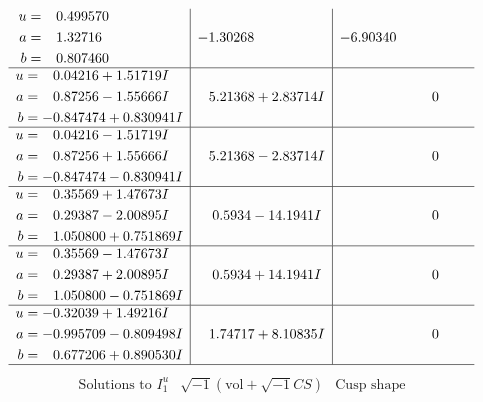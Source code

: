 \documentclass[1p]{elsarticle_modified}
\theoremstyle{definition}
\newcommand{\I}{\sqrt{-1}}
\begin{document}
$$\begin{array}{c|c|c}
\begin{aligned}
u &= \phantom{-}0.499570\phantom{ +0.000000I} \\
a &= \phantom{-}1.32716\phantom{ +0.000000I} \\
b &= \phantom{-}0.807460\phantom{ +0.000000I}\end{aligned}
 & -1.30268\phantom{ +0.000000I} & -6.90340\phantom{ +0.000000I} \\ \hline\begin{aligned}
u &= \phantom{-}0.04216 + 1.51719 I \\
a &= \phantom{-}0.87256 - 1.55666 I \\
b &= -0.847474 + 0.830941 I\end{aligned}
 & \phantom{-}5.21368 + 2.83714 I & \phantom{-0.000000 } 0 \\ \hline\begin{aligned}
u &= \phantom{-}0.04216 - 1.51719 I \\
a &= \phantom{-}0.87256 + 1.55666 I \\
b &= -0.847474 - 0.830941 I\end{aligned}
 & \phantom{-}5.21368 - 2.83714 I & \phantom{-0.000000 } 0 \\ \hline\begin{aligned}
u &= \phantom{-}0.35569 + 1.47673 I \\
a &= \phantom{-}0.29387 - 2.00895 I \\
b &= \phantom{-}1.050800 + 0.751869 I\end{aligned}
 & \phantom{-}0.5934 - 14.1941 I & \phantom{-0.000000 } 0 \\ \hline\begin{aligned}
u &= \phantom{-}0.35569 - 1.47673 I \\
a &= \phantom{-}0.29387 + 2.00895 I \\
b &= \phantom{-}1.050800 - 0.751869 I\end{aligned}
 & \phantom{-}0.5934 + 14.1941 I & \phantom{-0.000000 } 0 \\ \hline\begin{aligned}
u &= -0.32039 + 1.49216 I \\
a &= -0.995709 - 0.809498 I \\
b &= \phantom{-}0.677206 + 0.890530 I\end{aligned}
 & \phantom{-}1.74717 + 8.10835 I & \phantom{-0.000000 } 0\\
 \hline 
 \end{array}$$\newpage$$\begin{array}{c|c|c}  
\text{Solutions to }I^u_{1}& \I (\text{vol} + \sqrt{-1}CS) & \text{Cusp shape}\\

\end{array}$$
\end{document}
